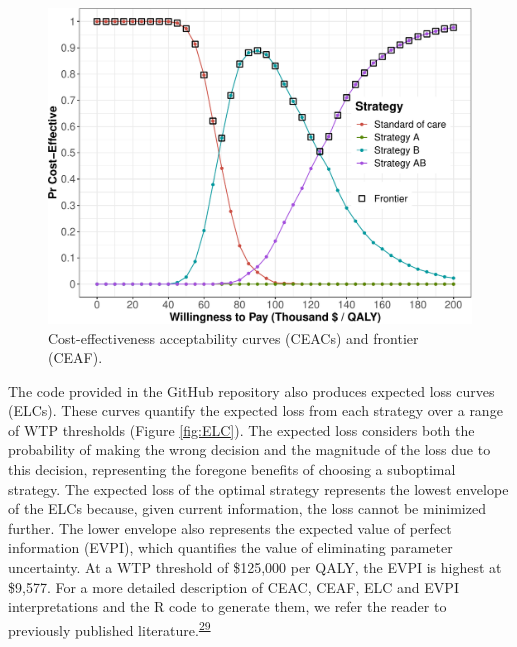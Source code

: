\documentclass[
]{article}
\begin{document}
\begin{figure}[H]

{\centering \includegraphics{figs/CEAC-1} 

}

\caption{Cost-effectiveness acceptability curves (CEACs) and frontier (CEAF).}\label{fig:CEAC}
\end{figure}

The code provided in the GitHub repository also produces expected loss curves (ELCs). These curves quantify the expected loss from each strategy over a range of WTP thresholds (Figure \ref{fig:ELC}). The expected loss considers both the probability of making the wrong decision and the magnitude of the loss due to this decision, representing the foregone benefits of choosing a suboptimal strategy. The expected loss of the optimal strategy represents the lowest envelope of the ELCs because, given current information, the loss cannot be minimized further. The lower envelope also represents the expected value of perfect information (EVPI), which quantifies the value of eliminating parameter uncertainty. At a WTP threshold of \$125,000 per QALY, the EVPI is highest at \$9,577. For a more detailed description of CEAC, CEAF, ELC and EVPI interpretations and the R code to generate them, we refer the reader to previously published literature.\textsuperscript{\protect\hyperlink{ref-Alarid-Escudero2019}{29}}
\end{document}
